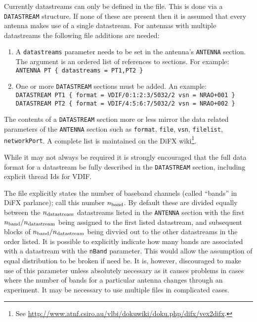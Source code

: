\documentclass[12pt]{article}
\begin{document}
Currently datastreams can only be defined in the \vd file.
This is done via a {\tt DATASTREAM} structure.
If none of these are present then it is assumed that every antenna makes use of a single datastream.
For antennas with multiple datastreams the following \vd file additions are needed:
\begin{enumerate}
\item A {\tt datastreams} parameter needs to be set in the antenna's {\tt ANTENNA} section.
The argument is an ordered list of references to  sections.
For example: \\

{\tt ANTENNA PT \{ datastreams = PT1,PT2 \}} \\

\item One or more {\tt DATASTREAM} sections must be added.
An example:\\

{\tt DATASTREAM PT1 \{ format = VDIF/0:1:2:3/5032/2 vsn = NRAO+001 \} } \\

{\tt DATASTREAM PT2 \{ format = VDIF/4:5:6:7/5032/2 vsn = NRAO+002 \} } \\

\end{enumerate}

The contents of a {\tt DATASTREAM} section more or less mirror the data related parameters of the {\tt ANTENNA} section such as {\tt format}, {\tt file},  {\tt vsn}, {\tt filelist}, {\tt networkPort}.
A complete list is maintained on the DiFX wiki\footnote{See \url{http://www.atnf.csiro.au/vlbi/dokuwiki/doku.php/difx/vex2difx}.}.

While it may not always be required it is strongly encouraged that the full data format for a datastream be fully described in the {\tt DATASTREAM} section, including explicit thread Ids for VDIF.

The \vx file explicitly states the number of baseband channels (called ``bands'' in DiFX parlance); call this number $n_{\rm band}$.
By default these are divided equally between the $n_{\rm datastream}$ datastreams listed in the {\tt ANTENNA} section with the first $n_{\rm band}/n_{\rm datastream}$ being assigned to the first listed datastream, and subsequent blocks of $n_{\rm band}/n_{\rm datastream}$ being divvied out to the other datastreams in the order listed.
It is possible to explicitly indicate how many bands are associated with a datastream with the {\tt nBand} parameter.
This would allow the assumption of equal distribution to be broken if need be.
It is, however, discouraged to make use of this parameter unless absolutely necessary as it causes problems in cases where the number of bands for a particular antenna changes through an experiment.
It may be necessary to use multiple \vd files in complicated cases.
\end{document}
